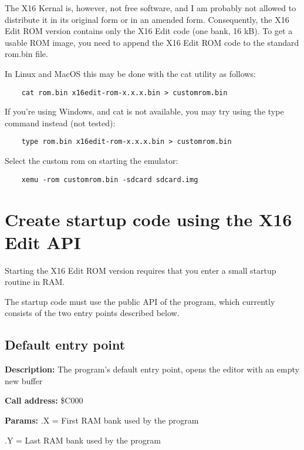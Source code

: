 \documentclass{article}
\begin{document}
    The X16 Kernal is, however, not free software, and I am probably not allowed to distribute it in its
    original form or in an amended form. Consequently, the X16 Edit ROM version contains only the X16 Edit code (one bank, 16 kB). To get a 
    usable ROM image, you need to append the X16 Edit ROM code to the standard
    rom.bin file.

    In Linux and MacOS this may be done with the cat utility as follows: 
    
    \begin{verbatim}
    cat rom.bin x16edit-rom-x.x.x.bin > customrom.bin
    \end{verbatim}

    If you're using Windows, and cat is not available, you may try using the type command instead (not tested):
    
    \begin{verbatim}
    type rom.bin x16edit-rom-x.x.x.bin > customrom.bin
    \end{verbatim}

    Select the custom rom on starting the emulator: 
    
    \begin{verbatim}
    xemu -rom customrom.bin -sdcard sdcard.img
    \end{verbatim}

\section{Create startup code using the X16 Edit API}

    Starting the X16 Edit ROM version requires that you enter a small startup
    routine in RAM.

    The startup code must use the public API of the program, which currently
    consists of the two entry points described below.

    \subsection{Default entry point}

        \begin{hangparas}{3cm}{1}

            \textbf{Description:} \tabto{3cm} The program's default entry point, opens the editor with an empty new buffer

            \textbf{Call address:} \tabto{3cm}\$C000

            \textbf{Params:} \tabto{3cm}.X = First RAM bank used by the program
        
            \tabto{3cm}.Y = Last RAM bank used by the program

        \end{hangparas}
\end{document}
